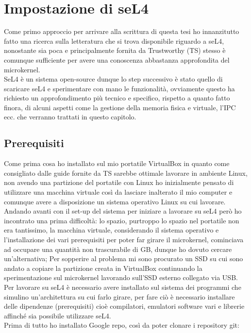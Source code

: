 \chapter{Impostazione di seL4}
Come primo approccio per arrivare alla scrittura di questa tesi ho innanzitutto fatto una ricerca sulla letteratura che si trova disponibile riguardo a seL4, nonostante sia poca e principalmente fornita da Trustworthy (TS) stesso è comunque sufficiente per avere una conoscenza abbastanza approfondita del microkernel.\\
SeL4 è un sistema open-source dunque lo step successivo è stato quello di scaricare seL4 e sperimentare con mano le funzionalità, ovviamente questo ha richiesto un approfondimento più tecnico e specifico, rispetto a quanto fatto finora, di alcuni aspetti come la gestione della memoria fisica e virtuale, l'IPC ecc. che verranno trattati in questo capitolo.

\section{Prerequisiti}
Come prima cosa ho installato sul mio portatile VirtualBox in quanto come consigliato dalle guide fornite da TS sarebbe ottimale lavorare in ambiente Linux, non avendo una partizione del portatile con Linux ho inizialmente pensato di utilizzare una macchina virtuale così da lasciare inalterato il mio computer e comunque avere a disposizione un sistema operativo Linux su cui lavorare. Andando avanti con il set-up del sistema per iniziare a lavorare su seL4 però ho incontrato una prima difficoltà: lo spazio, purtroppo lo spazio nel portatile non era tantissimo, la macchina virtuale, considerando il sistema operativo e l'installazione dei vari prerequisiti per poter far girare il microkernel, cominciava ad occupare una quantità non trascurabile di GB, dunque ho dovuto cercare un'alternativa; Per sopperire al problema mi sono procurato un SSD su cui sono andato a copiare la partizione creata in VirtualBox continuando la sperimentazione sul microkernel lavorando sull'SSD esterno collegato via USB.\\
Per lavorare su seL4 è necessario avere installato sul sistema dei programmi che simulino un'architettura su cui farlo girare, per fare ciò è necessario installare delle dipendenze (prerequisiti) cioè compilatori, emulatori software vari e librerie affinché sia possibile utilizzare seL4.\\
Prima di tutto ho installato Google repo, così da poter clonare i repository git:

